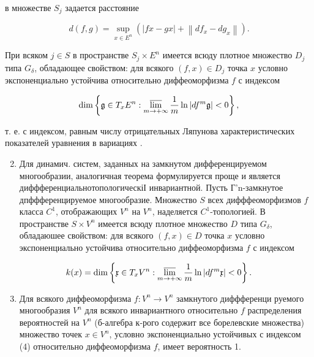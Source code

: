\documentclass[10pt]{article}
\begin{document}
в множестве $S_{j}$ задается расстояние



\[

d(f, g)=\sup _{x \in E^{n}}\left(|f x-g x|+\left\|d f_{x}-d g_{x}\right\|\right) .

\]



При всяком $j \in S$ в пространстве $S_{j} \times E^{n}$ имеется всюду плотное множество $D_{j}$ типа $G_{\delta}$, обладающее свойством: для всякого $(f, x) \in D_{j}$ точка $x$ условно экспоненциально устойчива относительно диффеоморфизма $f$ с индексом



\[

\operatorname{dim}\left\{\mathfrak{g} \in T_{x} E^{n}: \varlimsup_{m \rightarrow+\infty} \frac{1}{m} \ln \left|d f^{m} \mathfrak{g}\right|<0\right\},

\]



т. е. с индексом, равным числу отрицательных Ляпунова характеристических показателей уравнения в вариациях .



\begin{enumerate}

  \setcounter{enumi}{1}

  \item Для динамич. систем, заданных на замкнутом дифференцируемом многообразии, аналогичная теорема формулируется проще и является диффференциальнотопологическіІ инвариантной. Пусть Г'n-замкнутое дпффференцируемое многообразие. Множество $S$ всех дифффеоморфизмов $f$ класса $C^{1}$, отображающих $V^{n}$ на $V^{n}$, наделяется $C^{1}$-топологией. В пространстве $S \times V^{n}$ имеется всюду плотное множество $D$ типа $G_{\delta}$, обладаюшее свойством: для всякого $(f, x) \in D$ точка $x$ условно экспоненциально устойчива относительно диффеоморфизма $f$ с индексом

\end{enumerate}



\[

k(x)=\operatorname{dim}\left\{\mathfrak{x} \in T_{x} V^{n}: \varlimsup_{m \rightarrow+\infty} \frac{1}{m} \ln \left|d f^{m} \mathfrak{x}\right|<0\right\} .

\]



\begin{enumerate}

  \setcounter{enumi}{2}

  \item Для всякого диффеоморфизма $f: V^{n} \longrightarrow V^{n}$ замкнутого диффференци руемого многообразия $V^{n}$ для всякого инвариантного относительно $f$ распределения вероятностей на $V^{n}$ (б-алгебра к-рого содержит все борелевские множества) множество точек $x \in V^{n}$, условно экспоненциально устойчивых с индексом (4) относительно диффеоморфизма $f$, имеет вероятность 1.

\end{enumerate}
\end{document}
